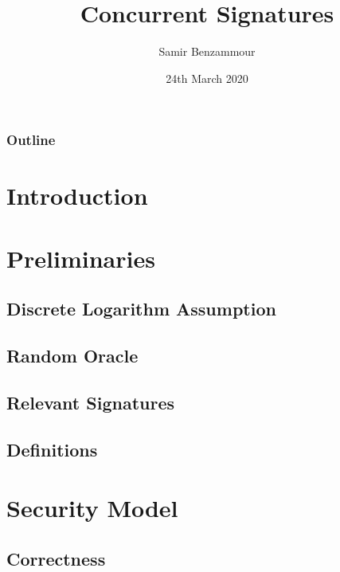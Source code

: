 \documentclass{beamer}
\title{Concurrent Signatures}
\author{Samir Benzammour}
\date{24th March 2020}
\institute[RWTH]{
  Algorithms and Computational Complexity\\
  RWTH Aachen University
}
\begin{document}
\frame{\titlepage}

\begin{frame}
	\frametitle{Outline}
	\tableofcontents
\end{frame}

\section{Introduction}


\section{Preliminaries}


\subsection{Discrete Logarithm Assumption}


\subsection{Random Oracle}


\subsection{Relevant Signatures}


\subsection{Definitions}
% 



\section{Security Model}


\subsection{Correctness}
% 
\end{document}
